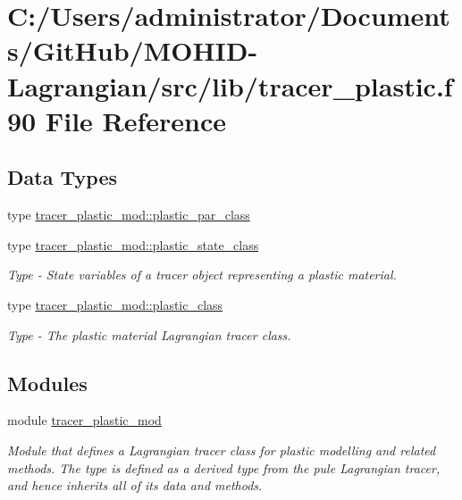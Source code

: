 \hypertarget{tracer__plastic_8f90}{}\section{C\+:/\+Users/administrator/\+Documents/\+Git\+Hub/\+M\+O\+H\+I\+D-\/\+Lagrangian/src/lib/tracer\+\_\+plastic.f90 File Reference}
\label{tracer__plastic_8f90}
\subsection*{Data Types}
\begin{DoxyCompactItemize}
\item 
type \hyperlink{structtracer__plastic__mod_1_1plastic__par__class}{tracer\+\_\+plastic\+\_\+mod\+::plastic\+\_\+par\+\_\+class}
\item 
type \hyperlink{structtracer__plastic__mod_1_1plastic__state__class}{tracer\+\_\+plastic\+\_\+mod\+::plastic\+\_\+state\+\_\+class}
\begin{DoxyCompactList}\small\item\em Type -\/ State variables of a tracer object representing a plastic material. \end{DoxyCompactList}\item 
type \hyperlink{structtracer__plastic__mod_1_1plastic__class}{tracer\+\_\+plastic\+\_\+mod\+::plastic\+\_\+class}
\begin{DoxyCompactList}\small\item\em Type -\/ The plastic material Lagrangian tracer class. \end{DoxyCompactList}\end{DoxyCompactItemize}
\subsection*{Modules}
\begin{DoxyCompactItemize}
\item 
module \hyperlink{namespacetracer__plastic__mod}{tracer\+\_\+plastic\+\_\+mod}
\begin{DoxyCompactList}\small\item\em Module that defines a Lagrangian tracer class for plastic modelling and related methods. The type is defined as a derived type from the pule Lagrangian tracer, and hence inherits all of it\textquotesingle{}s data and methods. \end{DoxyCompactList}\end{DoxyCompactItemize}
